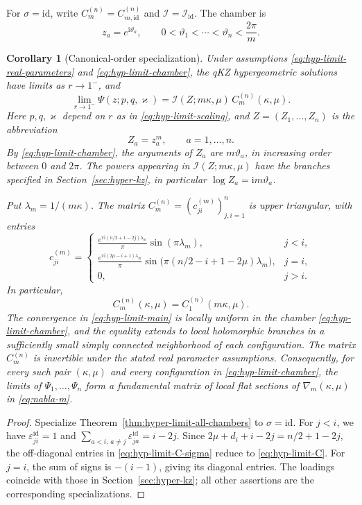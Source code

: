 \documentclass[12pt]{amsart}
\newtheorem{cor}[thm]{Corollary}
\theoremstyle{definition}
\numberwithin{equation}{section}
\theoremstyle{definition}
\let\mc\mathcal
\let\eps\varepsilon
\let\ka\kappa
\let\si\sigma
\def\beq{\begin{equation}}
\def\eeq{\end{equation}}
\begin{document}
For $\si=\mathrm{id}$, write $C_m^{(n)}=C_{m,\mathrm{id}}^{(n)}$
and $\mc I=\mc I_{\mathrm{id}}$. The chamber is
\beq\label{eq:hyp-limit-chamber}
 z_a=e^{\mathrm{i}\vartheta_a},\qquad
 0<\vartheta_1<\cdots<\vartheta_n<\frac{2\pi}{m}.
\eeq
\begin{cor}[Canonical-order specialization]
\label{cor:hyper-limit}
Under assumptions \eqref{eq:hyp-limit-real-parameters} and
\eqref{eq:hyp-limit-chamber}, the qKZ hypergeometric solutions
have limits as $r\to1^-$, and
\beq\label{eq:hyp-limit-main}
 \boxed{\quad
 \lim_{r\to1^-}\Psi(z;p,q,\varkappa)
 =\mc I(Z;m\ka,\mu)\,C_m^{(n)}(\ka,\mu).
 \quad}
\eeq
Here $p,q,\varkappa$ depend on $r$ as in
\eqref{eq:hyp-limit-scaling}, and $Z=(Z_1,\ldots,Z_n)$ is the
abbreviation
\[
 Z_a=z_a^m,\qquad a=1,\ldots,n.
\]
By \eqref{eq:hyp-limit-chamber}, the arguments of $Z_a$ are
$m\vartheta_a$, in increasing order between $0$ and $2\pi$.
The powers appearing in $\mc I(Z;m\ka,\mu)$ have the branches
specified in Section~\ref{sec:hyper-kz}, in particular
$\log Z_a=\mathrm{i}m\vartheta_a$.

Put $\lambda_m=1/(m\ka)$.  The matrix
$C_m^{(n)}=(c_{ji}^{(m)})_{j,i=1}^n$ is upper triangular,
with entries
\beq\label{eq:hyp-limit-C}
 \boxed{\quad
 c_{ji}^{(m)}=
 \begin{cases}
 \displaystyle
 \frac{e^{\pi\mathrm{i}(n/2+1-2j)\lambda_m}}{\pi}
       \sin(\pi\lambda_m),&j<i,\\[8pt]
 \displaystyle
 \frac{e^{\pi\mathrm{i}(2\mu-i+1)\lambda_m}}{\pi}
       \sin\!\bigl(\pi(n/2-i+1-2\mu)\lambda_m\bigr),&j=i,\\[8pt]
 0,&j>i.
 \end{cases}\quad}
\eeq
In particular,
\beq\label{eq:hyp-limit-C-compare}
 \boxed{\quad
 C_m^{(n)}(\ka,\mu)=C_1^{(n)}(m\ka,\mu).
 \quad}
\eeq
The convergence in \eqref{eq:hyp-limit-main} is locally uniform
in the chamber \eqref{eq:hyp-limit-chamber}, and the equality
extends to local holomorphic branches in a sufficiently small
simply connected neighborhood of each configuration.
The matrix $C_m^{(n)}$ is invertible under the stated real
parameter assumptions. Consequently, for every such pair
$(\ka,\mu)$ and every configuration in
\eqref{eq:hyp-limit-chamber}, the limits of
$\Psi_1,\ldots,\Psi_n$ form a fundamental matrix of local flat
sections of $\nabla_m(\ka,\mu)$ in \eqref{eq:nabla-m}.
\end{cor}

\begin{proof}
Specialize Theorem~\ref{thm:hyper-limit-all-chambers} to
$\si=\mathrm{id}$. For $j<i$, we have
$\eps_{ji}^{\mathrm{id}}=1$ and
$\sum_{a<i,\,a\ne j}\eps_{ja}^{\mathrm{id}}=i-2j$.
Since $2\mu+d_i+i-2j=n/2+1-2j$, the off-diagonal entries in
\eqref{eq:hyp-limit-C-sigma} reduce to \eqref{eq:hyp-limit-C}.
For $j=i$, the sum of signs is $-(i-1)$, giving its diagonal entries.
The loadings coincide with those in Section~\ref{sec:hyper-kz};
all other assertions are the corresponding specializations.
\end{proof}
\end{document}
